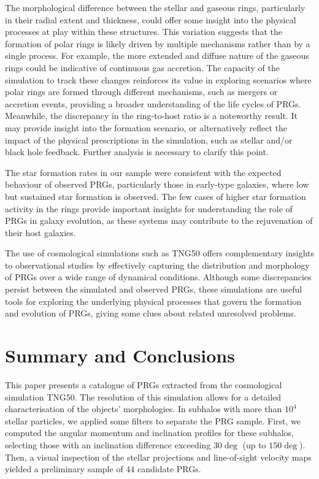 \documentclass[fleqn,usenatbib]{mnras}
\begin{document}
The morphological difference between the stellar and gaseous rings, particularly in their radial extent and thickness, could offer some insight into the physical processes at play within these structures. This variation suggests that the formation of polar rings is likely driven by multiple mechanisms rather than by a single process. For example, the more extended and diffuse nature of the gaseous rings could be indicative of continuous gas accretion. The capacity of the simulation to track these changes reinforces its value in exploring scenarios where polar rings are formed through different mechanisms, such as mergers or accretion events, providing a broader understanding of the life cycles of PRGs. Meanwhile, the discrepancy in the ring-to-host ratio is a noteworthy result. It may provide insight into the formation scenario, or alternatively reflect the impact of the physical prescriptions in the simulation, such as stellar and/or black hole feedback. Further analysis is necessary to clarify this point.

The star formation rates in our sample were consistent with the expected behaviour of observed PRGs, particularly those in early-type galaxies, where low but sustained star formation is observed. The few cases of higher star formation activity in the rings provide important insights for understanding the role of PRGs in galaxy evolution, as these systems may contribute to the rejuvenation of their host galaxies.

The use of cosmological simulations such as TNG50 offers complementary insights to observational studies by effectively capturing the distribution and morphology of PRGs over a wide range of dynamical conditions. Although some discrepancies persist between the simulated and observed PRGs, these simulations are useful tools for exploring the underlying physical processes that govern the formation and evolution of PRGs, giving some clues about related unresolved problems.


\section{Summary and Conclusions} \label{sec: conclusion}

This paper presents a catalogue of PRGs extracted from the cosmological simulation TNG50. The resolution of this simulation allows for a detailed characterisation of the objects' morphologies. In subhalos with more than $10^4$ stellar particles, we applied some filters to separate the PRG sample. First, we computed the angular momentum and inclination profiles for these subhalos, selecting those with an inclination difference exceeding $30 \deg$ (up to $150 \deg$). Then, a visual inspection of the stellar projections and line-of-sight velocity maps yielded a preliminary sample of 44 candidate PRGs.   
\end{document}
